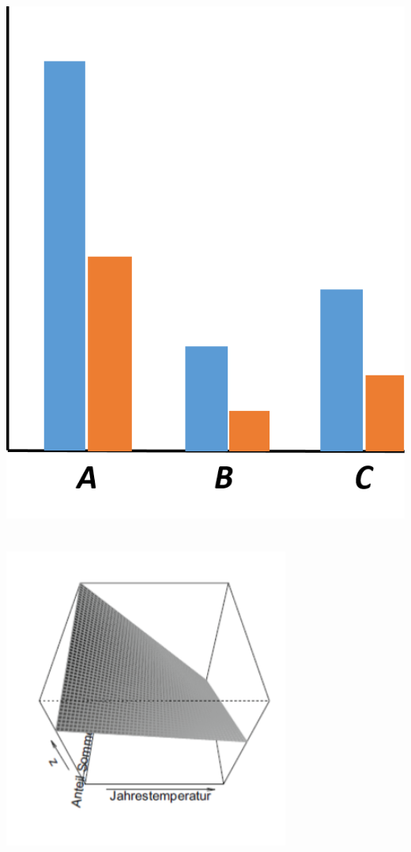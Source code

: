 \documentclass{beamer}
\begin{document}
\begin{frame}
\begin{columns}
\begin{column}{0.45\textwidth}
            \includegraphics[width=\textwidth]{lectures/day_3_LM_refresh_II/figures/no-inter-2.png}
        \end{column}
    \end{columns}
\end{frame}

\begin{frame}
    \frametitle{}
    \centering\includegraphics[width=0.7\textwidth]{lectures/day_3_LM_refresh_II/figures/2-cont-interactions.png}
\end{frame}
\end{document}
